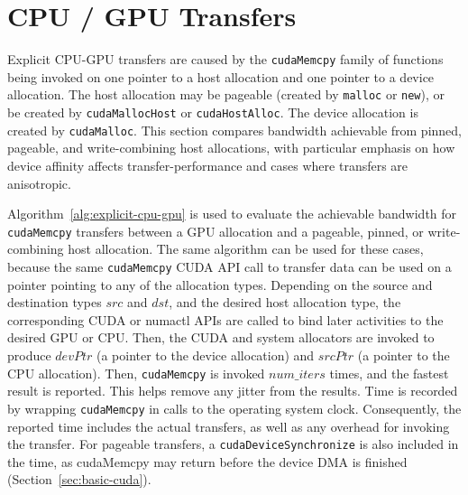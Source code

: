 \section{CPU / GPU Transfers}
\label{sec:explicit-cpu-gpu}

Explicit CPU-GPU transfers are caused by the \texttt{cudaMemcpy} family of functions being invoked on one pointer to a host allocation and one pointer to a device allocation.
The host allocation may be pageable (created by \texttt{malloc} or \texttt{new}), or be created by \texttt{cudaMallocHost} or \texttt{cudaHostAlloc}.
The device allocation is created by \texttt{cudaMalloc}.
This section compares bandwidth achievable from pinned, pageable, and write-combining host allocations, with particular emphasis on how device affinity affects transfer-performance and cases where transfers are anisotropic.

Algorithm~\ref{alg:explicit-cpu-gpu} is used to evaluate the achievable bandwidth for \texttt{cudaMemcpy} transfers between a GPU allocation and a pageable, pinned, or write-combining host allocation. 
The same algorithm can be used for these cases, because the same \texttt{cudaMemcpy} CUDA API call to transfer data can be used on a pointer pointing to any of the allocation types.
Depending on the source and destination types $src$ and $dst$, and the desired host allocation type, the corresponding CUDA or numactl APIs are called to bind later activities to the desired GPU or CPU.
Then, the CUDA and system allocators are invoked to produce $devPtr$ (a pointer to the device allocation) and $srcPtr$ (a pointer to the CPU allocation).
Then, \texttt{cudaMemcpy} is invoked $num\_iters$ times, and the fastest result is reported.
This helps remove any jitter from the results.
Time is recorded by wrapping \texttt{cudaMemcpy} in calls to the operating system clock.
Consequently, the reported time includes the actual transfers, as well as any overhead for invoking the transfer.
For pageable transfers, a \texttt{cudaDeviceSynchronize} is also included in the time, as cudaMemcpy may return before the device DMA is finished (Section~\ref{sec:basic-cuda}).


